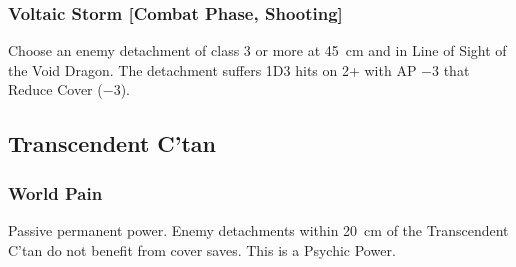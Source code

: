 \subsubsection{Voltaic Storm [Combat Phase, Shooting]}

Choose an enemy detachment of class 3 or more at 45~cm and in Line of Sight of the Void Dragon. The detachment suffers 1D3 hits on 2+ with AP $-3$ that Reduce Cover ($-3$).

\subsection{Transcendent C'tan}

\subsubsection{World Pain}

Passive permanent power. Enemy detachments within 20~cm of the Transcendent C'tan do not benefit from cover saves. This is a Psychic Power.
